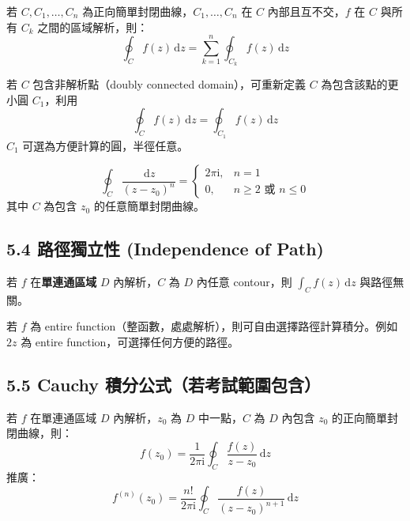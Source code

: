 \documentclass[12pt,a4paper]{article}
\newcommand{\dd}{\,\mathrm{d}}
\newcommand{\ii}{\mathrm{i}}
\begin{document}
\begin{theorembox}
若 $C,C_1,\dots,C_n$ 為正向簡單封閉曲線，$C_1,\dots,C_n$ 在 $C$ 內部且互不交，$f$ 在 $C$ 與所有 $C_k$ 之間的區域解析，則：
$$\oint_C f(z)\dd{z}=\sum_{k=1}^n\oint_{C_k}f(z)\dd{z}$$
\end{theorembox}

\begin{keybox}[路徑變形原理]
若 $C$ 包含非解析點（doubly connected domain），可重新定義 $C$ 為包含該點的更小圓 $C_1$，利用
$$\oint_C f(z)\dd{z}=\oint_{C_1}f(z)\dd{z}$$
$C_1$ 可選為方便計算的圓，半徑任意。
\end{keybox}

\begin{exbox}[重要結果]
$$\oint_C\frac{\dd{z}}{(z-z_0)^n}=\begin{cases}2\pi\ii, & n=1\\ 0, & n\ge 2 \text{ 或 } n\le 0\end{cases}$$
其中 $C$ 為包含 $z_0$ 的任意簡單封閉曲線。
\end{exbox}

\subsection{5.4 路徑獨立性 (Independence of Path)}

\begin{theorembox}
若 $f$ 在\textbf{單連通區域} $D$ 內解析，$C$ 為 $D$ 內任意 contour，則 $\displaystyle\int_C f(z)\dd{z}$ 與路徑無關。
\end{theorembox}

\begin{keybox}[應用]
若 $f$ 為 entire function（整函數，處處解析），則可自由選擇路徑計算積分。例如 $2z$ 為 entire function，可選擇任何方便的路徑。
\end{keybox}

\subsection{5.5 Cauchy 積分公式（若考試範圍包含）}

\begin{theorembox}
若 $f$ 在單連通區域 $D$ 內解析，$z_0$ 為 $D$ 中一點，$C$ 為 $D$ 內包含 $z_0$ 的正向簡單封閉曲線，則：
$$f(z_0)=\frac{1}{2\pi\ii}\oint_C\frac{f(z)}{z-z_0}\dd{z}$$
推廣：
$$f^{(n)}(z_0)=\frac{n!}{2\pi\ii}\oint_C\frac{f(z)}{(z-z_0)^{n+1}}\dd{z}$$
\end{theorembox}
\end{document}
